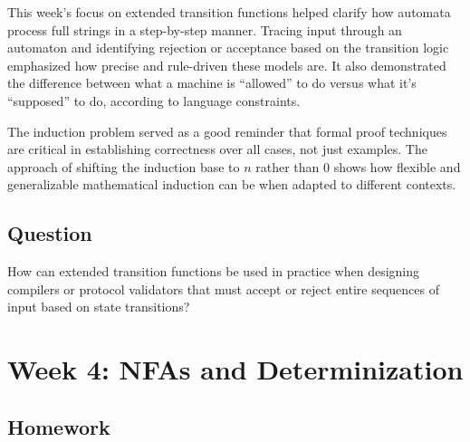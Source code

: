\documentclass[11pt]{article}
\begin{document}
This week's focus on extended transition functions helped clarify how automata process full strings in a step-by-step manner. Tracing input through an automaton and identifying rejection or acceptance based on the transition logic emphasized how precise and rule-driven these models are. It also demonstrated the difference between what a machine is “allowed” to do versus what it’s “supposed” to do, according to language constraints. 

The induction problem served as a good reminder that formal proof techniques are critical in establishing correctness over all cases, not just examples. The approach of shifting the induction base to \( n \) rather than 0 shows how flexible and generalizable mathematical induction can be when adapted to different contexts.

\subsection{Question}

How can extended transition functions be used in practice when designing compilers or protocol validators that must accept or reject entire sequences of input based on state transitions?


\section{Week 4: NFAs and Determinization}

\subsection{Homework}
\end{document}

